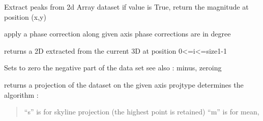 \documentclass[letterpaper,10pt,openany,oneside]{sphinxmanual}
\begin{document}
\begin{fulllineitems}
\begin{fulllineitems}
\end{fulllineitems}


\begin{fulllineitems}
\label{rst/code:NPKData.NPKData.peaks2d}
Extract peaks from 2d Array dataset
if value is True, return the magnitude at position (x,y)

\end{fulllineitems}


\begin{fulllineitems}
\label{rst/code:NPKData.NPKData.phase}
apply a phase correction along given axis
phase corrections are in degree

\end{fulllineitems}


\begin{fulllineitems}
\label{rst/code:NPKData.NPKData.plane}
returns a 2D extracted from the current 3D at position 0\textless{}=i\textless{}=size1-1

\end{fulllineitems}


\begin{fulllineitems}
\label{rst/code:NPKData.NPKData.plus}
Sets to zero the negative part of the data set
see also :  minus, zeroing

\end{fulllineitems}


\begin{fulllineitems}
\label{rst/code:NPKData.NPKData.proj}
returns a projection of the dataset on the given axis
projtype determines the algorithm :
\begin{quote}

``s'' is for skyline projection (the highest point is retained)
``m'' is for mean,
\end{quote}


\end{fulllineitems}
\end{fulllineitems}
\end{document}
